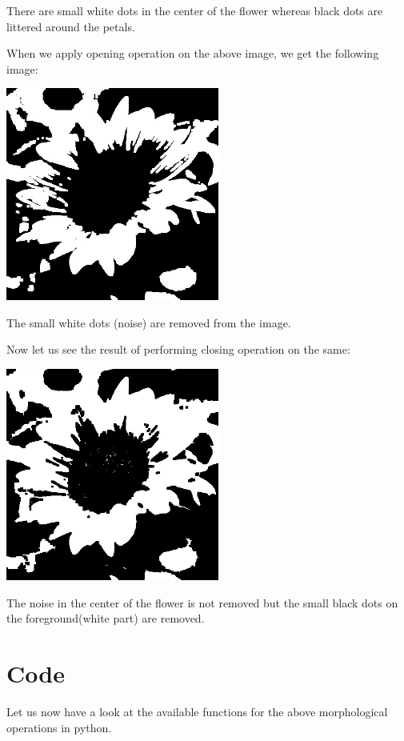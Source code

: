\documentclass[]{article}
\begin{document}
There are small white dots in the center of the flower whereas black
dots are littered around the petals.

When we apply opening operation on the above image, we get the following
image:
\begin{center}
\includegraphics[width = 7cm]{images/Morphological Operations/Images/Opened sunflower.jpg}
\end{center}

The small white dots (noise) are removed from the image.

Now let us see the result of performing closing operation on the same: \\
\begin{center}
\includegraphics[width = 7cm]{images/Morphological Operations/Images/Closed sunflower.jpg}
\end{center}
The noise in the center of the flower is not removed but the small black
dots on the foreground(white part) are removed.

\section{Code}\label{code}
Let us now have a
look at the available functions for the above morphological operations
in python.
\end{document}
